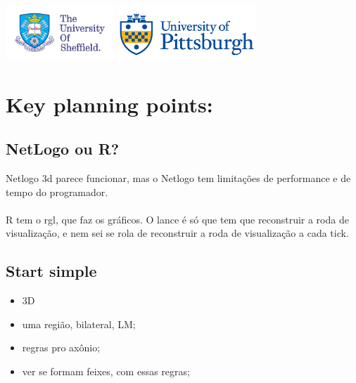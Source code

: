 \documentclass[a4paper,12pt]{texMemo}
\begin{document}
	

\includegraphics[height=0.8in]{Figures/Sheffield.png}   
\hfill 
\includegraphics[height=0.8in]{Figures/Pittsburgh.png}  


\vspace{1cm}

\maketitle %




\section{Key planning points:}

\subsection{NetLogo ou R?}

Netlogo 3d parece funcionar, mas o Netlogo tem limitações de performance e de tempo do programador. \\ \\
R tem o rgl, que faz os gráficos. O lance é só que tem que reconstruir a roda de visualização, e nem sei se rola de reconstruir a roda de visualização a cada tick.

\subsection{Start simple}

\begin{itemize}

\item 3D
\item uma região, bilateral, LM;
\item regras pro axônio;
\item ver se formam feixes, com essas regras;

\end{itemize}
\end{document}
